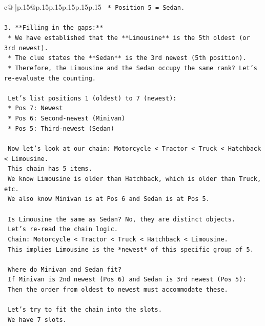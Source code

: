 \documentclass{article}
\begin{document}
{\begin{supertabular}{c@{$\;$}|p{.15\linewidth}@{}p{.15\linewidth}p{.15\linewidth}p{.15\linewidth}p{.15\linewidth}p{.15\linewidth}}
{{{\texttt{        *   Position 5 = Sedan.} \\
\\ 
\texttt{3.  **Filling in the gaps:**} \\
\texttt{    *   We have established that the **Limousine** is the 5th oldest (or 3rd newest).} \\
\texttt{    *   The clue states the **Sedan** is the 3rd newest (5th position).} \\
\texttt{    *   Therefore, the Limousine and the Sedan occupy the same rank? Let's re{-}evaluate the counting.} \\
\\ 
\texttt{    Let's list positions 1 (oldest) to 7 (newest):} \\
\texttt{    *   Pos 7: Newest} \\
\texttt{    *   Pos 6: Second{-}newest (Minivan)} \\
\texttt{    *   Pos 5: Third{-}newest (Sedan)} \\
\\ 
\texttt{    Now let's look at our chain: Motorcycle < Tractor < Truck < Hatchback < Limousine.} \\
\texttt{    This chain has 5 items.} \\
\texttt{    We know Limousine is older than Hatchback, which is older than Truck, etc.} \\
\texttt{    We also know Minivan is at Pos 6 and Sedan is at Pos 5.} \\
\\ 
\texttt{    Is Limousine the same as Sedan? No, they are distinct objects.} \\
\texttt{    Let's re{-}read the chain logic.} \\
\texttt{    Chain: Motorcycle < Tractor < Truck < Hatchback < Limousine.} \\
\texttt{    This implies Limousine is the *newest* of this specific group of 5.} \\
\\ 
\texttt{    Where do Minivan and Sedan fit?} \\
\texttt{    If Minivan is 2nd newest (Pos 6) and Sedan is 3rd newest (Pos 5):} \\
\texttt{    Then the order from oldest to newest must accommodate these.} \\
\\ 
\texttt{    Let's try to fit the chain into the slots.} \\
\texttt{    We have 7 slots.} \\
}}}
\end{supertabular}}
\end{document}
